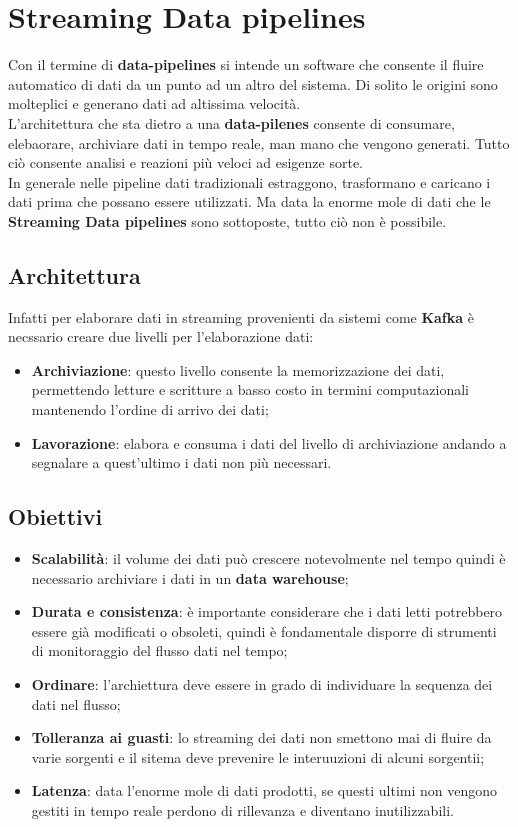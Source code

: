 \documentclass{article}
\begin{document}
\section{Streaming Data pipelines}
Con il termine di 
\textbf{data-pipelines} si intende un software che consente il fluire automatico di dati da un punto ad un altro del sistema.
Di solito le origini sono molteplici e generano dati ad altissima velocità.
\\
L'architettura che sta dietro a una \textbf{data-pilenes} consente di consumare, elebaorare, archiviare dati in tempo reale, man mano che vengono generati.
Tutto ciò consente analisi e reazioni più veloci ad esigenze sorte.
\\
In generale nelle pipeline dati tradizionali estraggono, trasformano e caricano i dati prima che possano essere utilizzati.
Ma data la enorme mole di dati che le \textbf{Streaming Data pipelines} sono sottoposte, tutto ciò non è possibile.
\subsection{Architettura}
Infatti per elaborare dati in streaming provenienti da sistemi come \textbf{Kafka} è necssario creare due livelli per l'elaborazione dati: 
\begin{itemize}
    \item \textbf{Archiviazione}:
    questo livello consente la memorizzazione
    dei dati, permettendo letture e scritture a basso costo in termini computazionali mantenendo l'ordine di arrivo dei dati;
    \item \textbf{Lavorazione}: elabora e consuma i dati del livello di archiviazione andando a segnalare a quest'ultimo i dati non più necessari.
\end{itemize}
\subsection{Obiettivi}
\begin{itemize}
    \item \textbf{Scalabilità}: il volume dei dati può crescere notevolmente nel tempo quindi è necessario archiviare i dati in un \textbf{data warehouse};
    \item \textbf{Durata e consistenza}: è importante considerare che i dati letti potrebbero essere già modificati o obsoleti, quindi è fondamentale disporre di strumenti di monitoraggio del flusso dati nel tempo;
    \item \textbf{Ordinare}: l'archiettura deve essere in grado di individuare la sequenza dei dati nel flusso;
    \item 
    \textbf{Tolleranza ai guasti}: lo streaming dei dati non smettono mai di fluire da varie sorgenti e il sitema deve prevenire le interuuzioni di alcuni sorgentii;
    \item 
    \textbf{Latenza}: data l'enorme mole di dati prodotti, se questi ultimi non vengono gestiti in tempo reale perdono di rillevanza e diventano inutilizzabili.
\end{itemize}
\clearpage
\end{document}
